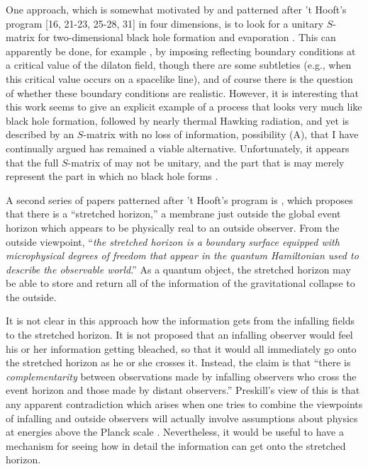      One approach, which is somewhat motivated by and patterned after
't Hooft's program
[16, 21-23, 25-28, 31]
in four dimensions, is to look for a unitary
$S$-matrix for two-dimensional black hole formation and evaporation
\cite{Mik,Ver93,Sch93,Rus93,Mik93}.  This can apparently be done,
for example \cite{Ver93,Sch93}, by imposing reflecting
boundary conditions at a critical value of the dilaton field, though
there are
some subtleties (e.g., when this critical value occurs on a spacelike
line),
and of course there is the question of whether these boundary
conditions are
realistic.  However, it is interesting that this work seems to give
an explicit
example of a process that looks very much like black hole formation,
followed
by nearly thermal Hawking radiation, and yet is described by an
$S$-matrix with
no loss of information, possibility (A), that I have continually
argued has
remained a viable alternative.  Unfortunately, it appears that the
full $S$-matrix of \cite{Ver93,Sch93} may not be unitary, and the
part that
is may merely represent the part in which no black hole forms
\cite{Suspri}.

     A second series of papers patterned after 't Hooft's program is
\cite{STU,Sus,SusT},
which proposes that there is a ``stretched horizon,'' a membrane just
outside the global event horizon which appears to be physically real
to an outside observer.  From the outside viewpoint,
``{\it the stretched horizon is a boundary surface
equipped with microphysical degrees of freedom that appear in the
quantum Hamiltonian used to describe the observable world}.''
As a quantum object, the stretched horizon may be able to store and
return all of the information of the gravitational collapse to the
outside.

     It is not clear in this approach how the information gets from
the
infalling fields to the stretched horizon.  It is not proposed that
an
infalling observer would feel his or her information getting
bleached,
so that it would all immediately go onto the stretched horizon
as he or she crosses it.
Instead, the claim is that ``there is {\it complementarity\/}
between observations made by infalling observers who cross the
event horizon and those made by distant observers.''  Preskill's
view of this \cite{Prepri,Suspri} is that any apparent contradiction
which arises when one tries to combine the viewpoints of infalling
and outside observers will actually involve assumptions about
physics at energies above the Planck scale \cite{SusT}.
Nevertheless, it would be useful to have a mechanism for seeing
how in detail the information can get onto the stretched horizon.

